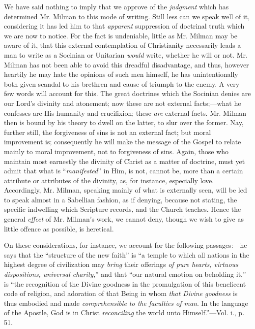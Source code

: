 We have said nothing to imply that we approve of
the \emph{judgment} which has determined Mr. Milman to this mode of writing.
Still less can we speak well of it, considering it has led him to that
\emph{apparent} suppression of doctrinal truth which we are now to
notice. For the fact is undeniable, little as Mr. Milman may be aware
of it, that this external contemplation of Christianity necessarily
leads a man to write as a Socinian or Unitarian \emph{would} write,
whether he will or not. Mr. Milman has not been able to avoid this
dreadful disadvantage, and thus, however heartily he may hate the
opinions of such men himself, he has unintentionally both given
scandal to his brethren and cause of triumph to the enemy. A very few
words will account for this. The great doctrines which the Socinian
denies are our Lord's divinity and atonement; now these are not
external facts;—what he confesses are His humanity and crucifixion;
these \emph{are} external facts. Mr. Milman then is bound by his
theory to dwell on the latter, to slur over the former. Nay, further
still, the forgiveness of sins is not an external fact; but
moral improvement is; consequently he will make the message of the
Gospel to relate mainly to moral improvement, not to forgiveness of
sins. Again, those who maintain most earnestly the divinity of Christ
as a matter of doctrine, must yet admit that what is ``\emph{manifested}''
in Him, is not, cannot be, more than a certain attribute or attributes
of the divinity, as, for instance, especially love. Accordingly, Mr.
Milman, speaking mainly of what is externally seen, will be led to
speak almost in a Sabellian fashion, as if denying, because not
stating, the specific indwelling which Scripture records, and the
Church teaches. Hence the general \emph{effect} of Mr. Milman's work,
we cannot deny, though we wish to give as little offence as possible,
is heretical.

On these considerations, for instance, we account
for the following passages:—he says that the ``structure of the new
faith'' is ``a temple to which all nations in the highest degree of
civilization may \emph{bring} their offerings \emph{of pure hearts,
virtuous dispositions, universal charity},'' and that ``our natural
emotion on beholding it,'' is ``the recognition of the Divine goodness in
the promulgation of this beneficent code of religion, and adoration of
that Being in whom \emph{that Divine goodness} is thus embodied and
made \emph{comprehensible to the faculties of man}. In the language of
the Apostle, God is in Christ \emph{reconciling} the world unto
Himself.''—Vol. i., p. 51.

